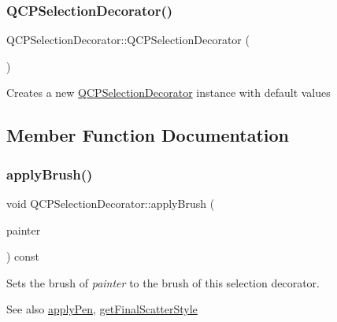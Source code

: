 \subsubsection{\texorpdfstring{Q\+C\+P\+Selection\+Decorator()}{QCPSelectionDecorator()}}
{\footnotesize\ttfamily Q\+C\+P\+Selection\+Decorator\+::\+Q\+C\+P\+Selection\+Decorator (\begin{DoxyParamCaption}{ }\end{DoxyParamCaption})}

Creates a new \hyperlink{class_q_c_p_selection_decorator}{Q\+C\+P\+Selection\+Decorator} instance with default values 

\subsection{Member Function Documentation}
\mbox{\label{class_q_c_p_selection_decorator_a225544527d51b49546b70d0e6d655a34}} 
\subsubsection{\texorpdfstring{apply\+Brush()}{applyBrush()}}
{\footnotesize\ttfamily void Q\+C\+P\+Selection\+Decorator\+::apply\+Brush (\begin{DoxyParamCaption}\item[{\hyperlink{class_q_c_p_painter}{Q\+C\+P\+Painter} $\ast$}]{painter }\end{DoxyParamCaption}) const}

Sets the brush of {\itshape painter} to the brush of this selection decorator.

\begin{DoxySeeAlso}{See also}
\hyperlink{class_q_c_p_selection_decorator_a75098893f7d08660ea449206810679d7}{apply\+Pen}, \hyperlink{class_q_c_p_selection_decorator_a1277b373248896bc70e8cc1de96da9fa}{get\+Final\+Scatter\+Style} 
\end{DoxySeeAlso}
\mbox{\label{class_q_c_p_selection_decorator_a75098893f7d08660ea449206810679d7}} 
